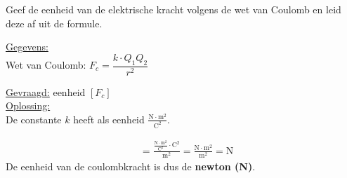 \documentclass{ximera}
\begin{document}
\begin{question}
    Geef de eenheid van de elektrische kracht volgens de wet van Coulomb en leid deze af uit de formule.

        \begin{solution}\nl
            \underline{Gegevens:}\\
            Wet van Coulomb: $F_{c}=\dfrac{k\cdot Q_{1}Q_{2}}{r^{2}}$

            \underline{Gevraagd:} eenheid $[F_{c}]$ \\

            \underline{Oplossing:}\\
            De constante $k$ heeft als eenheid $\mathrm{\frac{N\cdot m^2}{C^2}}$.  

            \begin{align*}
                [F_{c}] &= \frac{\mathrm{\frac{N\cdot m^2}{C^2}} \cdot \mathrm{C^2}}{\mathrm{m^2}} = \frac{\mathrm{N \cdot m^2}}{\mathrm{m^2}} = \mathrm{N}
            \end{align*}
            De eenheid van de coulombkracht is dus de \textbf{newton (N)}.\\
        \end{solution}
\end{question}
\end{document}
